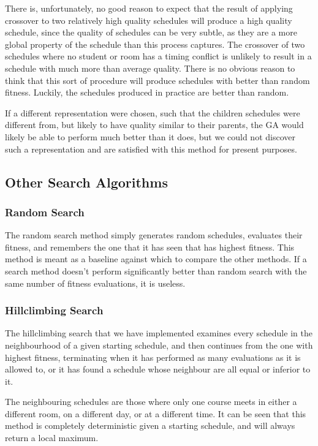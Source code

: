 \documentclass[letterpaper]{article}
\begin{document}
      There is, unfortunately, no good reason to expect that the result of applying 
      crossover to two relatively high quality schedules will produce a high quality 
      schedule, since the quality of schedules can be very subtle, as they are a more 
      global property of the schedule than this process captures. The crossover of two 
      schedules where no student or room has a timing conflict is unlikely to result in 
      a schedule with much more than average quality. There is no obvious reason to think 
      that this sort of procedure will produce schedules with better than random fitness. 
      Luckily, the schedules produced in practice are better than random.
      
      If a different representation were chosen, such that the children schedules were
      different from, but likely to have quality similar to their parents, the GA would 
      likely be able to perform much better than it does, but we could not discover such a
      representation and are satisfied with this method for present purposes.
      
  \subsection{Other Search Algorithms}
    \subsubsection{Random Search}
      The random search method simply generates random schedules, evaluates their fitness,
      and remembers the one that it has seen that has highest fitness. This method is meant
      as a baseline against which to compare the other methods. If a search method doesn't
      perform significantly better than random search with the same number of fitness
      evaluations, it is useless.
      
    \subsubsection{Hillclimbing Search}
      The hillclimbing search that we have implemented examines every schedule in the
      neighbourhood of a given starting schedule, and then continues from the one with
      highest fitness, terminating when it has performed as many evaluations as it is allowed
      to, or it has found a schedule whose neighbour are all equal or inferior to it.
      
      The neighbouring schedules are those where only one course meets in either a different
      room, on a different day, or at a different time. 
      It can be seen that this method is completely deterministic given a starting schedule,
      and will always return a local maximum.
\end{document}
